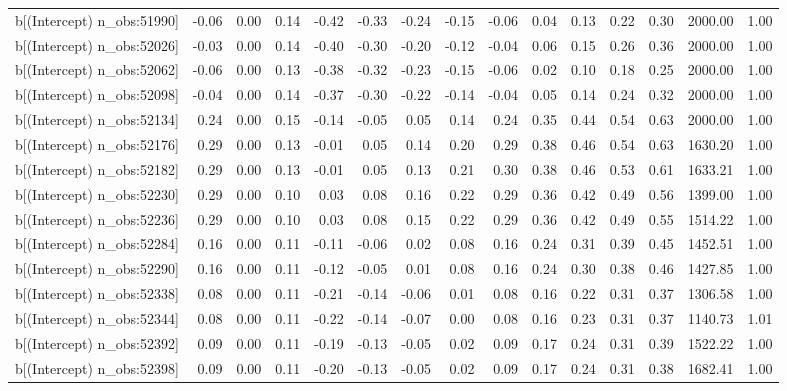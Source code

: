 \begin{table}[ht]
\begin{tabular}{rrrrrrrrrrrrrrr}
  b[(Intercept) n\_obs:51990] & -0.06 & 0.00 & 0.14 & -0.42 & -0.33 & -0.24 & -0.15 & -0.06 & 0.04 & 0.13 & 0.22 & 0.30 & 2000.00 & 1.00 \\ 
  b[(Intercept) n\_obs:52026] & -0.03 & 0.00 & 0.14 & -0.40 & -0.30 & -0.20 & -0.12 & -0.04 & 0.06 & 0.15 & 0.26 & 0.36 & 2000.00 & 1.00 \\ 
  b[(Intercept) n\_obs:52062] & -0.06 & 0.00 & 0.13 & -0.38 & -0.32 & -0.23 & -0.15 & -0.06 & 0.02 & 0.10 & 0.18 & 0.25 & 2000.00 & 1.00 \\ 
  b[(Intercept) n\_obs:52098] & -0.04 & 0.00 & 0.14 & -0.37 & -0.30 & -0.22 & -0.14 & -0.04 & 0.05 & 0.14 & 0.24 & 0.32 & 2000.00 & 1.00 \\ 
  b[(Intercept) n\_obs:52134] & 0.24 & 0.00 & 0.15 & -0.14 & -0.05 & 0.05 & 0.14 & 0.24 & 0.35 & 0.44 & 0.54 & 0.63 & 2000.00 & 1.00 \\ 
  b[(Intercept) n\_obs:52176] & 0.29 & 0.00 & 0.13 & -0.01 & 0.05 & 0.14 & 0.20 & 0.29 & 0.38 & 0.46 & 0.54 & 0.63 & 1630.20 & 1.00 \\ 
  b[(Intercept) n\_obs:52182] & 0.29 & 0.00 & 0.13 & -0.01 & 0.05 & 0.13 & 0.21 & 0.30 & 0.38 & 0.46 & 0.53 & 0.61 & 1633.21 & 1.00 \\ 
  b[(Intercept) n\_obs:52230] & 0.29 & 0.00 & 0.10 & 0.03 & 0.08 & 0.16 & 0.22 & 0.29 & 0.36 & 0.42 & 0.49 & 0.56 & 1399.00 & 1.00 \\ 
  b[(Intercept) n\_obs:52236] & 0.29 & 0.00 & 0.10 & 0.03 & 0.08 & 0.15 & 0.22 & 0.29 & 0.36 & 0.42 & 0.49 & 0.55 & 1514.22 & 1.00 \\ 
  b[(Intercept) n\_obs:52284] & 0.16 & 0.00 & 0.11 & -0.11 & -0.06 & 0.02 & 0.08 & 0.16 & 0.24 & 0.31 & 0.39 & 0.45 & 1452.51 & 1.00 \\ 
  b[(Intercept) n\_obs:52290] & 0.16 & 0.00 & 0.11 & -0.12 & -0.05 & 0.01 & 0.08 & 0.16 & 0.24 & 0.30 & 0.38 & 0.46 & 1427.85 & 1.00 \\ 
  b[(Intercept) n\_obs:52338] & 0.08 & 0.00 & 0.11 & -0.21 & -0.14 & -0.06 & 0.01 & 0.08 & 0.16 & 0.22 & 0.31 & 0.37 & 1306.58 & 1.00 \\ 
  b[(Intercept) n\_obs:52344] & 0.08 & 0.00 & 0.11 & -0.22 & -0.14 & -0.07 & 0.00 & 0.08 & 0.16 & 0.23 & 0.31 & 0.37 & 1140.73 & 1.01 \\ 
  b[(Intercept) n\_obs:52392] & 0.09 & 0.00 & 0.11 & -0.19 & -0.13 & -0.05 & 0.02 & 0.09 & 0.17 & 0.24 & 0.31 & 0.39 & 1522.22 & 1.00 \\ 
  b[(Intercept) n\_obs:52398] & 0.09 & 0.00 & 0.11 & -0.20 & -0.13 & -0.05 & 0.02 & 0.09 & 0.17 & 0.24 & 0.31 & 0.38 & 1682.41 & 1.00 \\ 

\end{tabular}
\end{table}

